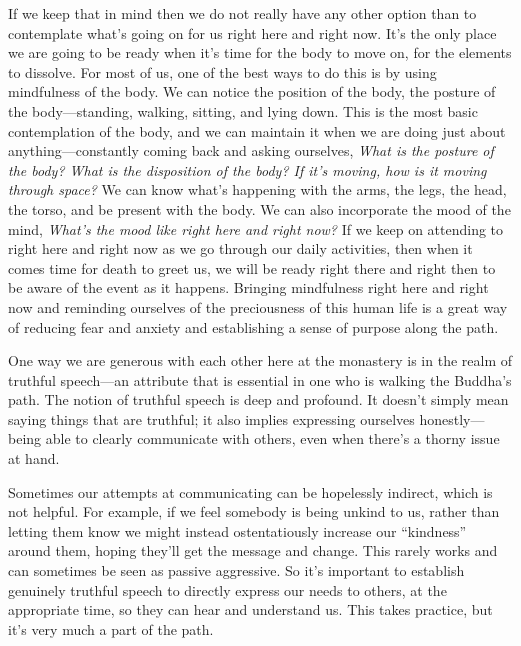 If we keep that in mind then we do not really have any other option 
than to contemplate what's going on for us right here and right now. 
It's the only place we are going to be ready when it's time for the 
body to move on, for the elements to dissolve. For most of us, one of 
the best ways to do this is by using mindfulness of the body. We can 
notice the position of the body, the posture of the body---standing, 
walking, sitting, and lying down. This is the most basic contemplation 
of the body, and we can maintain it when we are doing just about 
anything---constantly coming back and asking ourselves, \emph{What is 
the posture of the body? What is the disposition of the body? If it's 
moving, how is it moving through space?} We can know what's happening 
with the arms, the legs, the head, the torso, and be present with the 
body. We can also incorporate the mood of the mind, \emph{What's the 
mood like right here and right now?} If we keep on attending to right 
here and right now as we go through our daily activities, then when it 
comes time for death to greet us, we will be ready right there and 
right then to be aware of the event as it happens. Bringing mindfulness 
right here and right now and reminding ourselves of the preciousness of 
this human life is a great way of reducing fear and anxiety and 
establishing a sense of purpose along the path.


One way we are generous with each other here at the monastery is in the 
realm of truthful speech---an attribute that is essential in one who is 
walking the Buddha's path. The notion of truthful speech is deep and 
profound. It doesn't simply mean saying things that are truthful; it 
also implies expressing ourselves honestly---being able to clearly 
communicate with others, even when there's a thorny issue at hand.

Sometimes our attempts at communicating can be hopelessly indirect, 
which is not helpful. For example, if we feel somebody is being unkind 
to us, rather than letting them know we might instead ostentatiously 
increase our ``kindness'' around them, hoping they'll get the message 
and change. This rarely works and can sometimes be seen as passive 
aggressive. So it's important to establish genuinely truthful speech to 
directly express our needs to others, at the appropriate time, so they 
can hear and understand us. This takes practice, but it's very much a 
part of the path.

